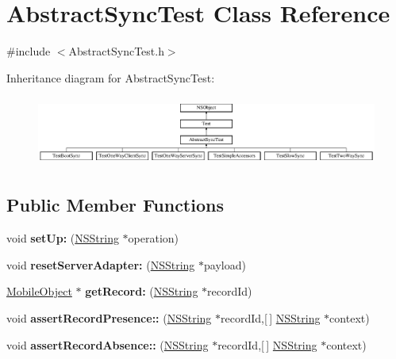 \hypertarget{interface_abstract_sync_test}{
\section{\-Abstract\-Sync\-Test \-Class \-Reference}
\label{interface_abstract_sync_test}
}


{\ttfamily \#include $<$\-Abstract\-Sync\-Test.\-h$>$}

\-Inheritance diagram for \-Abstract\-Sync\-Test\-:\begin{figure}[H]
\begin{center}
\leavevmode
\includegraphics[height=2.333333cm]{interface_abstract_sync_test}
\end{center}
\end{figure}
\subsection*{\-Public \-Member \-Functions}
\begin{DoxyCompactItemize}
\item 
\hypertarget{interface_abstract_sync_test_ae4a2262d1e10634ce74695c5bb917070}{
void {\bfseries set\-Up\-:} (\hyperlink{class_n_s_string}{\-N\-S\-String} $\ast$operation)}
\label{interface_abstract_sync_test_ae4a2262d1e10634ce74695c5bb917070}

\item 
\hypertarget{interface_abstract_sync_test_ac72287812c1817d576093cb5ab851d6b}{
void {\bfseries reset\-Server\-Adapter\-:} (\hyperlink{class_n_s_string}{\-N\-S\-String} $\ast$payload)}
\label{interface_abstract_sync_test_ac72287812c1817d576093cb5ab851d6b}

\item 
\hypertarget{interface_abstract_sync_test_a5c5496be71beb6469101643c08daf251}{
\hyperlink{interface_mobile_object}{\-Mobile\-Object} $\ast$ {\bfseries get\-Record\-:} (\hyperlink{class_n_s_string}{\-N\-S\-String} $\ast$record\-Id)}
\label{interface_abstract_sync_test_a5c5496be71beb6469101643c08daf251}

\item 
\hypertarget{interface_abstract_sync_test_a24594e0b8ef53b84f1c361e5340dfc3c}{
void {\bfseries assert\-Record\-Presence\-::} (\hyperlink{class_n_s_string}{\-N\-S\-String} $\ast$record\-Id,\mbox{[}$\,$\mbox{]} \hyperlink{class_n_s_string}{\-N\-S\-String} $\ast$context)}
\label{interface_abstract_sync_test_a24594e0b8ef53b84f1c361e5340dfc3c}

\item 
\hypertarget{interface_abstract_sync_test_acc43ad2297ff1500915c8cea7208c2e1}{
void {\bfseries assert\-Record\-Absence\-::} (\hyperlink{class_n_s_string}{\-N\-S\-String} $\ast$record\-Id,\mbox{[}$\,$\mbox{]} \hyperlink{class_n_s_string}{\-N\-S\-String} $\ast$context)}
\label{interface_abstract_sync_test_acc43ad2297ff1500915c8cea7208c2e1}

\end{DoxyCompactItemize}
